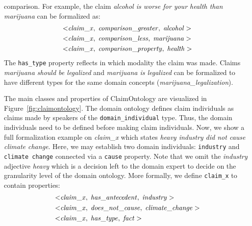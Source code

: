 comparison. For example, the claim \emph{alcohol is worse for your health than marijuana} can
be formalized as:
\begin{align*}
	< & \mathit{claim\_x}, \hspace{0.1cm} \mathit{comparison\_greater}, \hspace{0.1cm}
	\mathit{alcohol} > \\
	< & \mathit{claim\_x}, \hspace{0.1cm} \mathit{comparison\_less}, \hspace{0.1cm}
	\mathit{marijuana} >  \\
	< & \mathit{claim\_x}, \hspace{0.1cm} \mathit{comparison\_property}, \hspace{0.1cm}
	\mathit{health} > 
\end{align*}
The \texttt{has\_type} property reflects in which modality the claim was made. 
Claims \emph{marijuana should be legalized} and \emph{marijuana is legalized} 
can be formalized to have different types for the same domain concepts
(\emph{marijuana\_legalization}). 

The main classes and properties of ClaimOntology are visualized in 
Figure~\ref{fig:claimontology}. The domain ontology defines 
claim individuals as claims made by speakers of the
\texttt{domain\_individual} type. Thus, the domain individuals need to be
defined before making claim individuals. Now, we show a full formalization 
example on \emph{claim\_x} which states
\emph{heavy industry did not cause climate change}. Here, we may establish
two domain individuals: \texttt{industry} and \texttt{climate change}
connected via a \texttt{cause} property. Note that we omit the \emph{industry}
adjective \emph{heavy} which is a decision left to the domain expert to decide
on the granularity level of the domain ontology. 
More formally, we define \texttt{claim\_x} to contain properties:
\begin{align*}
	< & \mathit{claim\_x}, \hspace{0.1cm} \mathit{has\_antecedent}, \hspace{0.1cm}
	\mathit{industry} > \\
	< & \mathit{claim\_x}, \hspace{0.1cm} \mathit{does\_not\_cause}, \hspace{0.1cm}
	\mathit{climate\_change} >  \\
	< & \mathit{claim\_x}, \hspace{0.1cm} \mathit{has\_type}, \hspace{0.1cm}
	\mathit{fact} > 
\end{align*}

